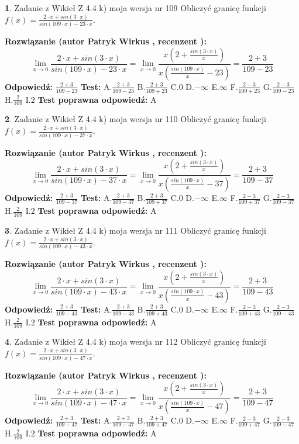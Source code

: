 \documentclass[12pt, a4paper]{article}
\theoremstyle{definition} %
\newtheorem{zad}{}
\newcommand{\zadStart}[1]{\begin{zad}#1\newline}
\newcommand{\zadStop}{\end{zad}}
\newcommand{\rozwStart}[2]{\noindent \textbf{Rozwiązanie (autor #1 , recenzent #2): }\newline}
\newcommand{\rozwStop}{\newline}
\newcommand{\odpStart}{\noindent \textbf{Odpowiedź:}\newline}
\newcommand{\odpStop}{\newline}
\newcommand{\testStart}{\noindent \textbf{Test:}\newline}
\newcommand{\testStop}{\newline}
\newcommand{\kluczStart}{\noindent \textbf{Test poprawna odpowiedź:}\newline}
\newcommand{\kluczStop}{\newline}
\begin{document}
\zadStart{Zadanie z Wikieł Z 4.4 k) moja wersja nr 109}
Obliczyć granicę funkcji $f(x)=\frac{2\cdot x +sin(3\cdot x)}{sin(109\cdot x) -23\cdot x}$.
\zadStop
\rozwStart{Patryk Wirkus}{}
$$\lim\limits_{x\to 0}\frac{2\cdot x +sin(3\cdot x)}{sin(109\cdot x) -23\cdot x}
=\lim\limits_{x\to 0}\frac{x(2+\frac{sin(3\cdot x)}{x})}{x(\frac{sin(109\cdot x)}{x}-23)}
=\frac{2+3}{109-23}$$
\rozwStop
\odpStart
$\frac{2+3}{109-23}$
\odpStop
\testStart
A.$\frac{2+3}{109-23}$
B.$\frac{2+3}{109+23}$
C.$0$
D.$-\infty$
E.$\infty$
F.$\frac{2-3}{109+23}$
G.$\frac{2-3}{109-23}$
H.$\frac{2}{109}$
I.$2$
\testStop
\kluczStart
A
\kluczStop



\zadStart{Zadanie z Wikieł Z 4.4 k) moja wersja nr 110}
Obliczyć granicę funkcji $f(x)=\frac{2\cdot x +sin(3\cdot x)}{sin(109\cdot x) -37\cdot x}$.
\zadStop
\rozwStart{Patryk Wirkus}{}
$$\lim\limits_{x\to 0}\frac{2\cdot x +sin(3\cdot x)}{sin(109\cdot x) -37\cdot x}
=\lim\limits_{x\to 0}\frac{x(2+\frac{sin(3\cdot x)}{x})}{x(\frac{sin(109\cdot x)}{x}-37)}
=\frac{2+3}{109-37}$$
\rozwStop
\odpStart
$\frac{2+3}{109-37}$
\odpStop
\testStart
A.$\frac{2+3}{109-37}$
B.$\frac{2+3}{109+37}$
C.$0$
D.$-\infty$
E.$\infty$
F.$\frac{2-3}{109+37}$
G.$\frac{2-3}{109-37}$
H.$\frac{2}{109}$
I.$2$
\testStop
\kluczStart
A
\kluczStop



\zadStart{Zadanie z Wikieł Z 4.4 k) moja wersja nr 111}
Obliczyć granicę funkcji $f(x)=\frac{2\cdot x +sin(3\cdot x)}{sin(109\cdot x) -43\cdot x}$.
\zadStop
\rozwStart{Patryk Wirkus}{}
$$\lim\limits_{x\to 0}\frac{2\cdot x +sin(3\cdot x)}{sin(109\cdot x) -43\cdot x}
=\lim\limits_{x\to 0}\frac{x(2+\frac{sin(3\cdot x)}{x})}{x(\frac{sin(109\cdot x)}{x}-43)}
=\frac{2+3}{109-43}$$
\rozwStop
\odpStart
$\frac{2+3}{109-43}$
\odpStop
\testStart
A.$\frac{2+3}{109-43}$
B.$\frac{2+3}{109+43}$
C.$0$
D.$-\infty$
E.$\infty$
F.$\frac{2-3}{109+43}$
G.$\frac{2-3}{109-43}$
H.$\frac{2}{109}$
I.$2$
\testStop
\kluczStart
A
\kluczStop



\zadStart{Zadanie z Wikieł Z 4.4 k) moja wersja nr 112}
Obliczyć granicę funkcji $f(x)=\frac{2\cdot x +sin(3\cdot x)}{sin(109\cdot x) -47\cdot x}$.
\zadStop
\rozwStart{Patryk Wirkus}{}
$$\lim\limits_{x\to 0}\frac{2\cdot x +sin(3\cdot x)}{sin(109\cdot x) -47\cdot x}
=\lim\limits_{x\to 0}\frac{x(2+\frac{sin(3\cdot x)}{x})}{x(\frac{sin(109\cdot x)}{x}-47)}
=\frac{2+3}{109-47}$$
\rozwStop
\odpStart
$\frac{2+3}{109-47}$
\odpStop
\testStart
A.$\frac{2+3}{109-47}$
B.$\frac{2+3}{109+47}$
C.$0$
D.$-\infty$
E.$\infty$
F.$\frac{2-3}{109+47}$
G.$\frac{2-3}{109-47}$
H.$\frac{2}{109}$
I.$2$
\testStop
\kluczStart
A
\kluczStop
\end{document}
